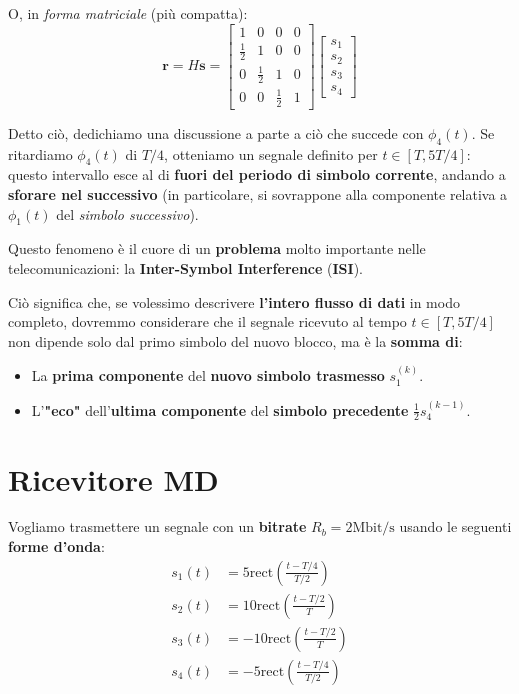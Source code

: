 O, in \textit{forma matriciale} (più compatta):
\[
    \mathbf{r} = H \mathbf{s} = 
    \begin{bmatrix} 1 & 0 & 0 & 0 \\ 
    \frac{1}{2} & 1 & 0 & 0 \\ 
    0 & \frac{1}{2} & 1 & 0 \\ 
    0 & 0 & \frac{1}{2} & 1
    \end{bmatrix} \begin{bmatrix} s_{1} \\ s_{2} \\ s_{3} \\ s_{4} \end{bmatrix} 
\]

Detto ciò, dedichiamo una discussione a parte a ciò che succede con $\phi_{4}(t)$.
Se ritardiamo $\phi_{4}(t)$ di $T/4$, otteniamo un segnale definito per
$t\in [T, 5T/4]$: questo intervallo esce al di \textbf{fuori del periodo di simbolo corrente},
andando a \textbf{sforare nel successivo} (in particolare, si sovrappone alla componente
relativa a $\phi_{1}(t)$ del \textit{simbolo successivo}).

\begin{remark}[ISI]
    Questo fenomeno è il cuore di un \textbf{problema} molto importante
    nelle telecomunicazioni: la \textbf{Inter-Symbol Interference} (\textbf{ISI}).
\end{remark}

Ciò significa che, se volessimo descrivere \textbf{l'intero flusso di dati} in modo completo, 
dovremmo considerare che il segnale ricevuto al tempo $t \in [T,5T/4]$ non dipende solo 
dal primo simbolo del nuovo blocco, ma è la \textbf{somma di}:
\begin{itemize}
    \item La \textbf{prima componente} del \textbf{nuovo simbolo trasmesso} $s_{1}^{(k)}$.
    \item L'\textbf{"eco"} dell'\textbf{ultima componente} del 
        \textbf{simbolo precedente} $\frac{1}{2}s_{4}^{(k-1)}$.
\end{itemize}

\section{Ricevitore MD}

Vogliamo trasmettere un segnale con un \textbf{bitrate} $R_b = 2 \text{Mbit/s}$ usando
le seguenti \textbf{forme d'onda}:
\[
    \begin{aligned}
        s_{1}(t) &= 5 \text{rect} \left( \frac{t - T/4}{T / 2} \right) \\ 
        s_{2}(t) &= 10 \text{rect} \left( \frac{t - T/2}{T} \right) \\
        s_{3}(t) &= -10 \text{rect} \left( \frac{t - T/2}{T} \right) \\
        s_{4}(t) &= -5 \text{rect} \left( \frac{t - T/4}{T / 2} \right) \\
    \end{aligned}
\]

